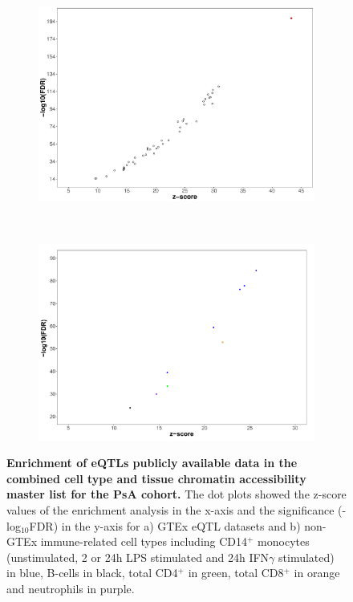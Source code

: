 \bigskip
\begin{figure}[H]
\centering
\begin{subfigure}[b]{0.7\textwidth}
\centering 
\includegraphics[width=\textwidth]{./Results3/pdfs/ATAC_PSA_all_GTeX_eQTL_enrichment_dotplot}
\caption{}
\end{subfigure}
~
\begin{subfigure}[b]{0.7\textwidth} 
\centering
\includegraphics[width=\textwidth]{./Results3/pdfs/ATAC_PSA_all_Jknight_eQTL_enrichment_dotplot}
\caption{}
\end{subfigure}
\caption[Enrichment of eQTLs publicly available data in the combined cell type and tissue chromatin accessibility master list for the PsA cohort.]{\textbf{Enrichment of eQTLs publicly available data in the combined cell type and tissue chromatin accessibility master list for the PsA cohort.} The dot plots showed the z-score values of the enrichment analysis in the x-axis and the significance (-log$_10$FDR) in the y-axis for a) GTEx eQTL datasets and b) non-GTEx immune-related cell types including CD14$^+$ monocytes (unstimulated, 2 or 24h LPS stimulated and 24h IFN$\gamma$ stimulated) in blue, B-cells in black, total CD4$^+$ in green, total CD8$^+$ in orange and neutrophils in purple.}
\label{figure:PsA_FAST_ATAC_eQTL_enrichment}
\end{figure}





